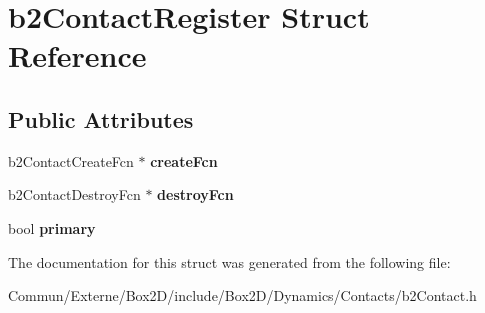 \hypertarget{structb2_contact_register}{}\section{b2\+Contact\+Register Struct Reference}
\label{structb2_contact_register}
\subsection*{Public Attributes}
\begin{DoxyCompactItemize}
\item 
b2\+Contact\+Create\+Fcn $\ast$ {\bfseries create\+Fcn}\hypertarget{structb2_contact_register_ae065de11ab2f164bd1b8e3a461b41824}{}\label{structb2_contact_register_ae065de11ab2f164bd1b8e3a461b41824}

\item 
b2\+Contact\+Destroy\+Fcn $\ast$ {\bfseries destroy\+Fcn}\hypertarget{structb2_contact_register_a95862aec746f5fd6ffa00a6729dec61f}{}\label{structb2_contact_register_a95862aec746f5fd6ffa00a6729dec61f}

\item 
bool {\bfseries primary}\hypertarget{structb2_contact_register_a43f2d79909505b785b9034b21a56525e}{}\label{structb2_contact_register_a43f2d79909505b785b9034b21a56525e}

\end{DoxyCompactItemize}


The documentation for this struct was generated from the following file\+:\begin{DoxyCompactItemize}
\item 
Commun/\+Externe/\+Box2\+D/include/\+Box2\+D/\+Dynamics/\+Contacts/b2\+Contact.\+h\end{DoxyCompactItemize}
